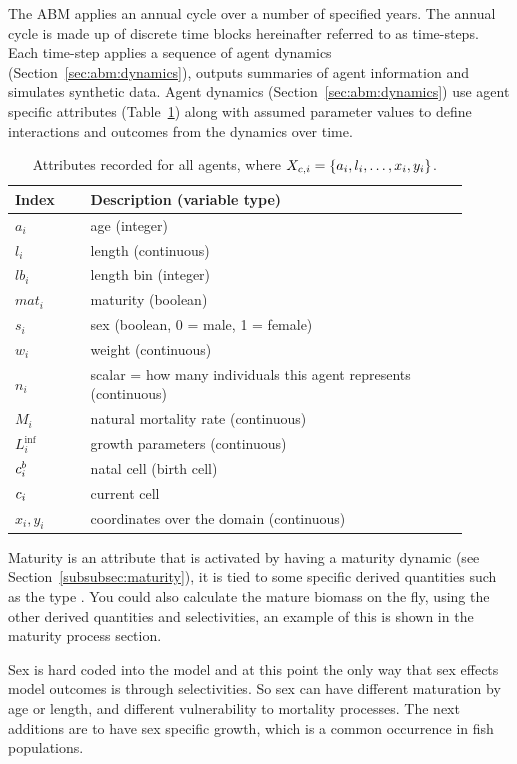 The ABM applies an annual cycle over a number of specified years. The annual cycle is made up of discrete time blocks hereinafter referred to as time-steps. Each time-step applies a sequence of agent dynamics (Section~\ref{sec:abm:dynamics}), outputs summaries of agent information and simulates synthetic data. Agent dynamics (Section~\ref{sec:abm:dynamics}) use agent specific attributes (Table~\ref{tab:agent_atrtributes}) along with assumed parameter values to define interactions and outcomes from the dynamics over time.
\begin{table}[H]
	\centering
	\caption{Attributes recorded for all agents, where \(X_{c, i} = \{a_i,l_i, \dots ,  x_i, y_i\}\).}
	\label{tab:agent_atrtributes}
	\begin{tabular}{|p{0.15\linewidth} | p{0.75\linewidth}|}
		\hline
		Index  & Description (variable type) \\ 
		\hline
		\(a_i\) & age (integer) \\
		\(l_i\) & length (continuous)\\	
		\(lb_i\) & length bin (integer)\\
		\(mat_i\) & maturity (boolean)\\	
		\(s_i\) & sex (boolean, 0 = male, 1 = female)\\		
		\(w_i\) & weight (continuous)\\
		\(n_i\) & scalar = how many individuals this agent represents  (continuous)\\		
		\(M_i\) & natural mortality rate (continuous)\\	
		\(L_i^{\inf}\) & growth parameters (continuous)\\	
		\(c^b_i\) & natal cell (birth cell)\\	
		\(c_i\) & current cell\\	
		\(x_i, y_i\) & coordinates over the domain (continuous)	\\
		\hline 		 						
	\end{tabular}
\end{table}

Maturity is an attribute that is activated by having a maturity dynamic (see Section~\ref{subsubsec:maturity}), it is tied to some specific derived quantities such as the type . You could also calculate the mature biomass on the fly, using the other derived quantities and selectivities, an example of this is shown in the maturity process section.

Sex is hard coded into the model and at this point the only way that sex effects model outcomes is through selectivities. So sex can have different maturation by age or length, and different vulnerability to mortality processes. The next additions are to have sex specific growth, which is a common occurrence in fish populations.

